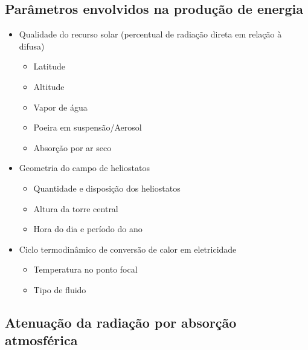 \documentclass[12pt,notheorems,hyperref={pdfauthor=Professor Rafael Nardi}]{beamer}
\begin{document}
\subsection{Parâmetros envolvidos na produção de energia}

\begin{frame}%
	\begin{itemize}
		\item Qualidade do recurso solar (percentual de radiação direta em relação à difusa)
			\begin{itemize}
				\item Latitude
				\item Altitude
				\item Vapor de água
				\item Poeira em suspensão/Aerosol
				\item Absorção por ar seco
			\end{itemize} \pause
			\bigskip
		\item Geometria do campo de heliostatos
			\begin{itemize}
				\item Quantidade e disposição dos heliostatos
				\item Altura da torre central
				\item Hora do dia e período do ano
			\end{itemize} \pause
			\bigskip
		\item Ciclo termodinâmico de conversão de calor em eletricidade
			\begin{itemize}
				\item Temperatura no ponto focal
				\item Tipo de fluido
			\end{itemize}
	\end{itemize}
\end{frame}

\subsection{Atenuação da radiação por absorção atmosférica}
\end{document}
